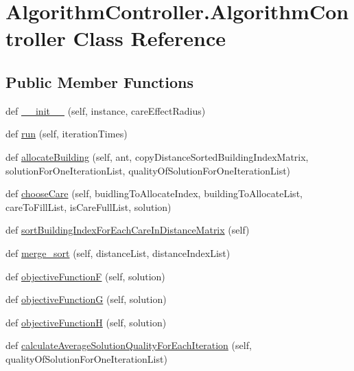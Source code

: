 \hypertarget{class_algorithm_controller_1_1_algorithm_controller}{}\section{Algorithm\+Controller.\+Algorithm\+Controller Class Reference}
\label{class_algorithm_controller_1_1_algorithm_controller}
\subsection*{Public Member Functions}
\begin{DoxyCompactItemize}
\item 
def \mbox{\hyperlink{class_algorithm_controller_1_1_algorithm_controller_a2f8217779ecd4b8ffbcb6869a8abf5ef}{\+\_\+\+\_\+init\+\_\+\+\_\+}} (self, instance, care\+Effect\+Radius)
\item 
def \mbox{\hyperlink{class_algorithm_controller_1_1_algorithm_controller_a16c94d71907fe272accefc3b11d202ef}{run}} (self, iteration\+Times)
\item 
def \mbox{\hyperlink{class_algorithm_controller_1_1_algorithm_controller_aceaf2f248880e85bebd1d1c5a3ee50e2}{allocate\+Building}} (self, ant, copy\+Distance\+Sorted\+Building\+Index\+Matrix, solution\+For\+One\+Iteration\+List, quality\+Of\+Solution\+For\+One\+Iteration\+List)
\item 
def \mbox{\hyperlink{class_algorithm_controller_1_1_algorithm_controller_a3e4df24f596b73789fe10ef001dc4fd7}{choose\+Care}} (self, buidling\+To\+Allocate\+Index, building\+To\+Allocate\+List, care\+To\+Fill\+List, is\+Care\+Full\+List, solution)
\item 
def \mbox{\hyperlink{class_algorithm_controller_1_1_algorithm_controller_a6be8ad6c0ed5d3733cc3678f4e73a6f5}{sort\+Building\+Index\+For\+Each\+Care\+In\+Distance\+Matrix}} (self)
\item 
def \mbox{\hyperlink{class_algorithm_controller_1_1_algorithm_controller_a93353daa1fde6df34d6b22af6a773610}{merge\+\_\+sort}} (self, distance\+List, distance\+Index\+List)
\item 
def \mbox{\hyperlink{class_algorithm_controller_1_1_algorithm_controller_a93b60c2a1787e8d5c3f940ddd6d051e9}{objective\+FunctionF}} (self, solution)
\item 
def \mbox{\hyperlink{class_algorithm_controller_1_1_algorithm_controller_a96414bd12515fbd19bc103cbc0b9cdcb}{objective\+FunctionG}} (self, solution)
\item 
def \mbox{\hyperlink{class_algorithm_controller_1_1_algorithm_controller_abe539c495b1f651be7198f43c7640ce0}{objective\+FunctionH}} (self, solution)
\item 
def \mbox{\hyperlink{class_algorithm_controller_1_1_algorithm_controller_a6b570c9ebad1e6a937e74490fab6a8a9}{calculate\+Average\+Solution\+Quality\+For\+Each\+Iteration}} (self, quality\+Of\+Solution\+For\+One\+Iteration\+List)
\end{DoxyCompactItemize}
